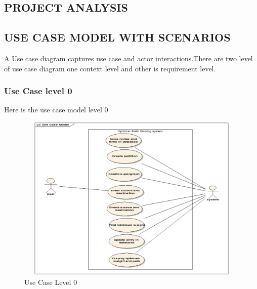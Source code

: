 \begin{center}

\chapter{\large PROJECT ANALYSIS}

\justifying
\section{\normalsize USE CASE MODEL WITH SCENARIOS}
\vspace*{2mm}
\hspace{5mm} A Use case diagram captures use case and actor interactions.There are two level of use case diagram one context  level and other is requirement level.\\

\justifying
\subsection{\small Use Case level 0}
\vspace*{2mm}
\hspace{5mm}Here is the use case model level 0\\
\begin{figure}[H]
\includegraphics[width=13cm,height=8cm]{usecase0.eps}
\caption{Use Case Level 0}
\end{figure}



\end{center}
